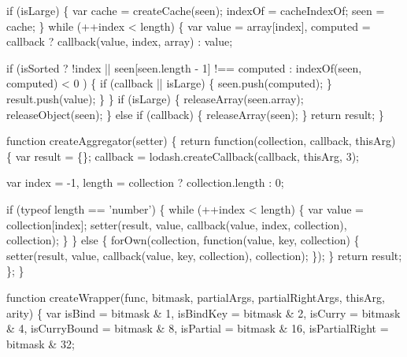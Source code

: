 \begin{DoxyCodeInclude}
      \textcolor{keywordflow}{if} (isLarge) \{
        var cache = createCache(seen);
        indexOf = cacheIndexOf;
        seen = cache;
      \}
      \textcolor{keywordflow}{while} (++index < length) \{
        var value = array[index],
            computed = callback ? callback(value, index, array) : value;

        \textcolor{keywordflow}{if} (isSorted
              ? !index || seen[seen.length - 1] !== computed
              : indexOf(seen, computed) < 0
            ) \{
          \textcolor{keywordflow}{if} (callback || isLarge) \{
            seen.push(computed);
          \}
          result.push(value);
        \}
      \}
      \textcolor{keywordflow}{if} (isLarge) \{
        releaseArray(seen.array);
        releaseObject(seen);
      \} \textcolor{keywordflow}{else} \textcolor{keywordflow}{if} (callback) \{
        releaseArray(seen);
      \}
      \textcolor{keywordflow}{return} result;
    \}

    \textcolor{keyword}{function} createAggregator(setter) \{
      \textcolor{keywordflow}{return} \textcolor{keyword}{function}(collection, callback, thisArg) \{
        var result = \{\};
        callback = lodash.createCallback(callback, thisArg, 3);

        var index = -1,
            length = collection ? collection.length : 0;

        \textcolor{keywordflow}{if} (typeof length == \textcolor{stringliteral}{'number'}) \{
          \textcolor{keywordflow}{while} (++index < length) \{
            var value = collection[index];
            setter(result, value, callback(value, index, collection), collection);
          \}
        \} \textcolor{keywordflow}{else} \{
          forOwn(collection, \textcolor{keyword}{function}(value, key, collection) \{
            setter(result, value, callback(value, key, collection), collection);
          \});
        \}
        \textcolor{keywordflow}{return} result;
      \};
    \}

    \textcolor{keyword}{function} createWrapper(func, bitmask, partialArgs, partialRightArgs, thisArg, arity) \{
      var isBind = bitmask & 1,
          isBindKey = bitmask & 2,
          isCurry = bitmask & 4,
          isCurryBound = bitmask & 8,
          isPartial = bitmask & 16,
          isPartialRight = bitmask & 32;


\end{DoxyCodeInclude}
